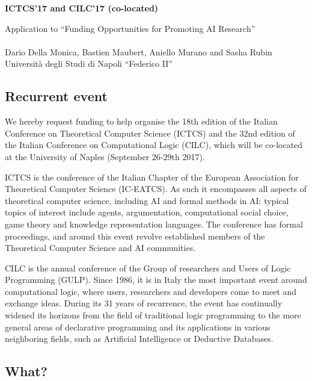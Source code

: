 \documentclass[12pt]{article}
\begin{document}
\begin{spacing}{1}
\begin{center}
  {\Large \bf ICTCS'17 and CILC'17 (co-located)}
\end{center}


\begin{center}
  {Application to ``Funding Opportunities for Promoting AI Research''}\\
  ~\\
  {Dario Della Monica, Bastien Maubert, Aniello Murano and Sasha Rubin}\\
  {Universit\`a degli Studi di Napoli ``Federico II''}
\end{center}

\subsection*{Recurrent event}

We hereby request funding to help organise the 18th
edition of the Italian Conference on Theoretical Computer Science
(ICTCS) and the 32nd edition of the
Italian Conference on Computational Logic (CILC), which will be
co-located at the University of Naples (September 26-29th 2017).

ICTCS is the conference of the Italian Chapter of the European Association for
Theoretical Computer Science (IC-EATCS). As such it encompasses all
aspects of theoretical computer science, including
AI and formal methods in AI: typical topics of interest include
agents, argumentation, computational social choice, game theory and
knowledge representation languages. The conference has formal
proceedings, and around this event revolve
established members of the Theoretical Computer Science and AI communities.

CILC is the annual conference of the Group of researchers and Users of Logic
Programming (GULP). Since 1986, it is
in Italy the most important event around computational logic, where users,
researchers and developers come to   meet and exchange ideas.
During its 31 years of recurrence, the event has continually widened its
horizons from the field of traditional logic programming to the more general
areas of declarative programming and its applications in various neighboring
fields, such as Artificial Intelligence or Deductive Databases.

\subsection*{What?}


\end{spacing}
\end{document}

